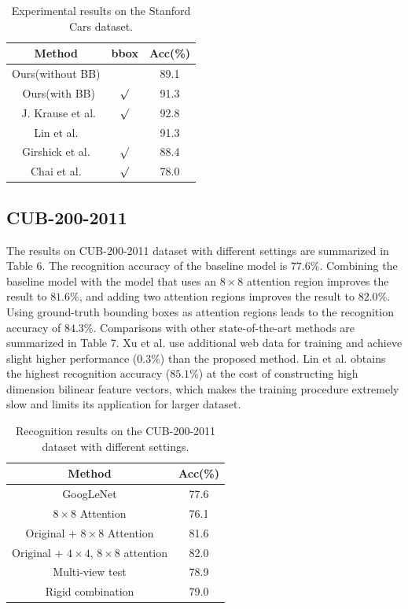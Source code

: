 \documentclass[runningheads]{llncs}
\begin{document}
\begin{table}[htb]
\begin{center}
\begin{tabular}
{c||c|c}\hline
Method &  bbox & Acc(\%) \\\hline\hline
Ours(without BB) &  & 89.1 \\\
Ours(with BB) & $\surd$ & 91.3 \\\
J. Krause et al. \cite{bd22} &  $\surd$ & 92.8 \\
Lin et al. \cite{bd16} &  & 91.3 \\
Girshick et al. \cite{bd24} & $\surd$ & 88.4 \\
Chai et al. \cite{bd25} & $\surd$  & 78.0 \\\hline
\end{tabular}
\caption{Experimental results on the Stanford Cars dataset.}
\vspace{-12pt}
\end{center}
\end{table}

\subsection{CUB-200-2011}
The results on CUB-200-2011 dataset with different settings are summarized in Table 6.
The recognition accuracy  of the baseline model is $77.6\%$.
Combining  the baseline model with the model that uses an $8\times8$ attention region improves the result to $81.6\%$, and adding two attention regions improves the result to $82.0\%$.
Using ground-truth bounding boxes as attention regions leads to the recognition accuracy of $84.3\%$.
Comparisons with other state-of-the-art methods are summarized in Table 7. Xu et al. \cite{bd23} use additional web data for training and achieve slight higher performance ($0.3\%$) than the proposed method. Lin et al. \cite{bd16} obtains the highest recognition accuracy ($85.1\%$) at the cost of constructing high dimension bilinear feature vectors, which makes the training procedure extremely slow and limits its application for larger dataset.

\begin{table}[htb]
\begin{center}
\begin{tabular}
{c|c}\hline
Method &   Acc(\%) \\\hline\hline
GoogLeNet  & 77.6 \\
$8\times8$ Attention  & 76.1 \\
Original + $8\times8$ Attention & 81.6 \\
Original + $4\times4$, $8\times8$ attention & 82.0 \\
Multi-view test  & 78.9 \\
Rigid combination & 79.0 \\\hline
\end{tabular}
\caption{Recognition results on the CUB-200-2011 dataset with different settings.}
\vspace{-20pt}
\end{center}
\end{table}
\end{document}
